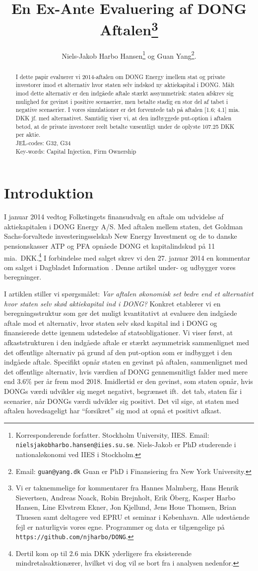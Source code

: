 \documentclass{article}
\title{En Ex-Ante Evaluering af DONG Aftalen\thanks{Vi er taknemmelige for kommentarer fra Hannes Malmberg, Hans Henrik Sievertsen, Andreas Noack, Robin Brejnholt, Erik {\"O}berg, Kasper Harbo Hansen, Line Elvstrøm Ekner, Jon Kjellund,  Jens Houe Thomsen, Brian Thuesen samt deltagere ved EPRU et seminar i København. Alle udestående fejl er naturligvis vores egne.  Programmer og data er tilgængelige på \texttt{https://github.com/njharbo/DONG}.} \\ }
\author{Niels-Jakob Harbo Hansen\thanks{Korresponderende forfatter. Stockholm University, IIES.  Email: \texttt{nielsjakobharbo.hansen@iies.su.se}. Niels-Jakob er PhD studerende i nationaløkonomi ved IIES i Stockholm.} \hspace{0.1 mm} og Guan Yang\thanks{Email: \texttt{guan@yang.dk} Guan er PhD i Finansiering fra New York University.  }. }
\begin{document}
\maketitle

\begin{abstract}
\onehalfspacing
 I dette papir evaluerer vi 2014-aftalen om DONG Energy imellem stat og private investorer imod et alternativ hvor staten selv indskød ny aktiekapital i DONG. Målt imod dette alternativ er den indgåede aftale stærkt assymmetrisk: staten afskrev sig mulighed for gevinst i positive scenaerier, men betalte stadig en stor del af tabet i negative scenaerier. I vores simulationer er det forventede tab på aftalen [1.6; 4.1] mia. DKK jf. med alternativet. Samtidig viser vi, at den indbyggede put-option i aftalen betød, at de private investorer reelt betalte væsentligt under de oplyste 107.25 DKK per aktie. \\
 JEL-codes: G32, G34 \\
 Key-words: Capital Injection, Firm Ownership
\end{abstract}


\newpage

\section{Introduktion}


I januar 2014 vedtog Folketingets finansudvalg en aftale om udvidelse af aktiekapitalen i DONG Energy A/S. Med aftalen mellem staten, det Goldman Sachs-forvaltede investeringsselskab New Energy Investment og de to danske pensionskasser ATP og PFA opnåede DONG et kapitalindskud på 11 mia.\ DKK.\footnote{Dertil kom op til 2.6 mia DKK yderligere fra eksisterende mindretalsaktionærer, hvilket vi dog vil se bort fra i analysen nedenfor.} I forbindelse med salget skrev vi den 27. januar 2014 en kommentar om salget i Dagbladet Information \citep{Hansen2014}. Denne artikel under- og udbygger vores beregninger.

I artiklen stiller vi spørgsmålet: \emph{Var aftalen økonomisk set bedre end et alternativt hvor staten selv skød aktiekapital ind i DONG?} Konkret etablerer vi en beregningsstruktur som gør det muligt kvantitativt at evaluere den indgåede aftale mod et alternativ, hvor staten selv skød kapital ind i DONG og finansierede dette igennem udstedelse af statsobligationer. Vi viser først, at afkaststrukturen i den indgåede aftale er stærkt asymmetrisk sammenlignet med det offentlige alternativ på grund af den put-option som er indbygget i den indgåede aftale. Specifikt opnår staten en gevinst på aftalen, sammenlignet med det offentlige alternativ, hvis værdien af DONG gennemsnitligt falder med mere end 3.6\% per år frem mod 2018. Imidlertid er den gevinst, som staten opnår, hvis DONGs værdi udvikler sig meget negativt, begrænset ift.\ det tab, staten får i scenarier, når DONGs værdi udvikler sig positivt. Det vil sige, at staten med aftalen hovedsageligt har \enquote{forsikret} sig mod at opnå et positivt afkast. 
\end{document}
